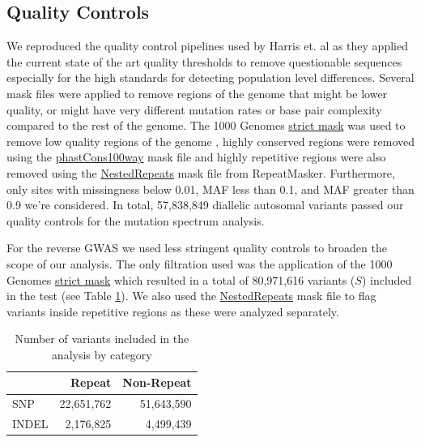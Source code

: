 \documentclass[9pt,lineno]{elife}
\begin{document}
\subsection{Quality Controls}
We reproduced the quality control pipelines used by Harris et. al as they applied the current state of the art quality thresholds to remove questionable sequences especially for the high standards for detecting population level differences. 
Several mask files were applied to remove regions of the genome that might be lower quality, or might have very different mutation rates or base pair complexity compared to the rest of the genome. 
The  1000 Genomes \href{http://ftp.1000genomes.ebi.ac.uk/vol1/ftp/release/20130502/supporting/accessible_genome_masks/20141020.strict_mask.whole_genome.bed}{strict mask} was used to remove low quality regions of the genome , highly conserved regions were removed using the \href{http://hgdownload.cse.ucsc.edu/goldenPath/hg19/database/phastConsElements100way.txt.gz}{phastCons100way} mask file and highly repetitive regions were also removed using the \href{http://hgdownload.cse.ucsc.edu/goldenpath/hg19/database/nestedRepeats.txt.gz}{NestedRepeats} mask file from RepeatMasker. 
Furthermore, only sites with missingness below 0.01, MAF less than 0.1, and MAF greater than 0.9 we're considered.
In total, 57,838,849 diallelic autosomal variants passed our quality controls for the mutation spectrum analysis.

For the reverse GWAS we used less stringent quality controls to broaden the scope of our analysis. The only filtration used was the application of the  1000 Genomes \href{http://ftp.1000genomes.ebi.ac.uk/vol1/ftp/release/20130502/supporting/accessible_genome_masks/20141020.strict_mask.whole_genome.bed}{strict mask} which resulted in a total of 80,971,616 variants ($S$) included in the test (see Table \ref{totTable}). We also used the \href{http://hgdownload.cse.ucsc.edu/goldenpath/hg19/database/nestedRepeats.txt.gz}{NestedRepeats} mask file to flag variants inside repetitive regions as these were analyzed separately.

\begin{table}[h]
\begin{tabular}{l  r r}
                      & {Repeat}  & {Non-Repeat}       \\ \hline
{SNP}  & 22,651,762 & 51,643,590  \\  
{INDEL} &  2,176,825  & 4,499,439 \\ \hline
\end{tabular}
\caption{Number of variants included in the analysis by category}
\label{totTable}
\end{table}
\end{document}
